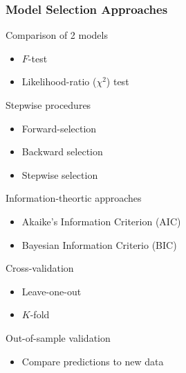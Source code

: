 \documentclass[color=usenames,dvipsnames]{beamer}\usepackage[]{graphicx}\usepackage[]{color}
\begin{document}
\begin{frame}
  \frametitle{Model Selection Approaches}
    Comparison of 2 models
      \begin{itemize}
        \item $F$-test
        \item Likelihood-ratio ($\chi^2$) test
      \end{itemize}
      \pause
    Stepwise procedures
      \begin{itemize}
        \item Forward-selection
        \item Backward selection
        \item Stepwise selection
      \end{itemize}
      \pause
    Information-theortic approaches
      \begin{itemize}
        \item Akaike's Information Criterion (AIC)
        \item Bayesian Information Criterio (BIC)
      \end{itemize}
      \pause
    Cross-validation
      \begin{itemize}
        \item Leave-one-out
        \item $K$-fold %
      \end{itemize}
      \pause
    Out-of-sample validation
      \begin{itemize}
        \item Compare predictions to new data
      \end{itemize}
\end{frame}
\end{document}
